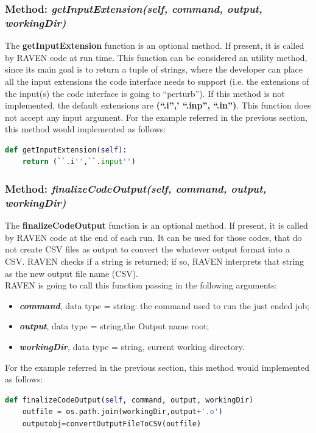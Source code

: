 \subsubsection{Method: \textit{getInputExtension(self, command, output, workingDir)}} 
\label{subsubsec:getInputExtension}
The \textbf{getInputExtension} function is an optional method. If present, it is called 
by RAVEN code at run time.  This function can be considered an utility method, since its
main goal is to return a tuple of strings, where the developer can place all the input extensions
the code interface needs to support (i.e. the extensions of the input(s) the code interface
is going to ``perturb''). If this method is not implemented, the default extensions are  \textbf{(``.i'',' ``.inp'', ``.in'')}.
This function does not accept any input argument.
For the example referred in the previous section, this method would implemented as follows:
\newline
\begin{lstlisting}[language=python]
def getInputExtension(self):
    return (``.i'',``.input'')
 \end{lstlisting} 
\subsubsection{Method: \textit{finalizeCodeOutput(self, command, output, workingDir)}} 
\label{subsubsec:finializeCodeOutput}
The \textbf{finalizeCodeOutput} function is an optional method. If present, it is called 
by RAVEN code at the end of each run. It can be used for those codes, that do not create CSV 
files as output to convert the whatever output format into a CSV. RAVEN checks if a string is returned; 
if so, RAVEN interprets that string as the new output file name (CSV).
\\RAVEN is going to call this function passing in the following arguments:
\begin{itemize}
  \item \textbf{\textit{command}}, data type = string: the command used to run 
                    the just ended job;
  \item \textbf{\textit{output}}, data type = string,the Output name root;
  \item  \textbf{\textit{workingDir}}, data type = string, current working directory.
\end{itemize}
For the example referred in the previous section, this method would implemented as follows:
\newline
\begin{lstlisting}[language=python]
def finalizeCodeOutput(self, command, output, workingDir)
    outfile = os.path.join(workingDir,output+'.o')
    outputobj=convertOutputFileToCSV(outfile)
 \end{lstlisting} 
 
